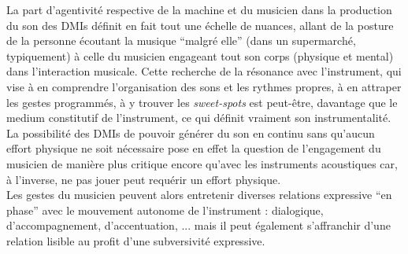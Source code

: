 \indent La part d'agentivité respective de la machine et du musicien dans la production du son des \glspl{DMI} définit en fait tout une échelle de nuances, allant de la posture de la personne écoutant la musique ``malgré elle'' (dans un supermarché, typiquement) à celle du musicien engageant tout son corps (physique et mental) dans l'interaction musicale. Cette recherche de la résonance avec l'instrument, qui vise à en comprendre l'organisation des sons et les rythmes propres, à en attraper les gestes programmés, à y trouver les \textit{sweet-spots} est peut-être, davantage que le medium constitutif de l'instrument, ce qui définit vraiment son instrumentalité. La possibilité des \glspl{DMI} de pouvoir générer du son en continu sans qu'aucun effort physique ne soit nécessaire pose en effet la question de l'engagement du musicien de manière plus critique encore qu'avec les instruments acoustiques car, à l'inverse, ne pas jouer peut requérir un effort physique.\\
\indent Les gestes du musicien peuvent alors entretenir diverses relations expressive ``en phase'' avec le mouvement autonome de l'instrument : dialogique, d'accompagnement, d'accentuation, ... mais il peut également s'affranchir d'une relation lisible au profit d'une subversivité expressive.




